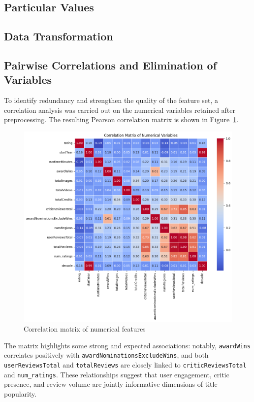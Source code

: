 \documentclass[10pt]{article}
\begin{document}
\subsection{Particular Values}
\subsection{Data Transformation}

\subsection{Pairwise Correlations and Elimination of Variables}

To identify redundancy and strengthen the quality of the feature set, a correlation analysis was carried out on the numerical variables retained after preprocessing. The resulting Pearson correlation matrix is shown in Figure~\ref{fig:correlation-matrix}.

\begin{figure}[H]
\centering
\includegraphics[width=0.85\linewidth]{correlation_matrix.png}
\caption{Correlation matrix of numerical features}
\label{fig:correlation-matrix}
\end{figure}

The matrix highlights some strong and expected associations: notably, \texttt{awardWins} correlates positively with \texttt{awardNominationsExcludeWins}, and both \texttt{userReviewsTotal} and \texttt{totalReviews} are closely linked to \texttt{criticReviewsTotal} and \texttt{num\_ratings}. These relationships suggest that user engagement, critic presence, and review volume are jointly informative dimensions of title popularity. 
\end{document}

